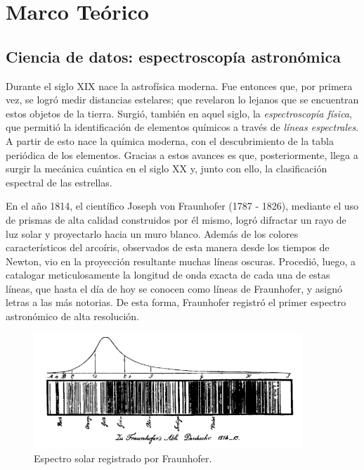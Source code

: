 \chapter{Marco Teórico}


\section{Ciencia de datos: espectroscopía astronómica}

Durante el siglo XIX nace la astrofísica moderna. Fue entonces que, por primera vez, se logró medir distancias estelares; que revelaron lo lejanos que se encuentran estos objetos de la tierra. Surgió, también en aquel siglo, la \textit{espectroscopía física}, que permitió la identificación de elementos químicos a través de \textit{líneas espectrales}. A partir de esto nace la química moderna, con el descubrimiento de la tabla periódica de los elementos. Gracias a estos avances es que, posteriormente, llega a surgir la mecánica cuántica en el siglo XX y, junto con ello, la clasificación espectral de las estrellas.

En el año 1814, el científico Joseph von Fraunhofer (1787 - 1826), mediante el uso de prismas de alta calidad construidos por él mismo, logró difractar un rayo de luz solar y proyectarlo hacia un muro blanco. Además de los colores característicos del arcoíris, observados de esta manera desde los tiempos de Newton, vio en la proyección resultante muchas líneas oscuras. Procedió, luego, a catalogar meticulosamente la longitud de onda exacta de cada una de estas líneas, que hasta el día de hoy se conocen como líneas de Fraunhofer, y asignó letras a las más notorias. De esta forma, Fraunhofer registró el primer espectro astronómico de alta resolución.

\begin{figure}[h!]
\begin{center}
\includegraphics[width=0.9\textwidth]{imagenes/fraunhofer_sun.png}
\end{center}
\vspace*{-5mm}
\caption{Espectro solar registrado por Fraunhofer.}
\label{fig:fraunhofer_sun}
\end{figure}

